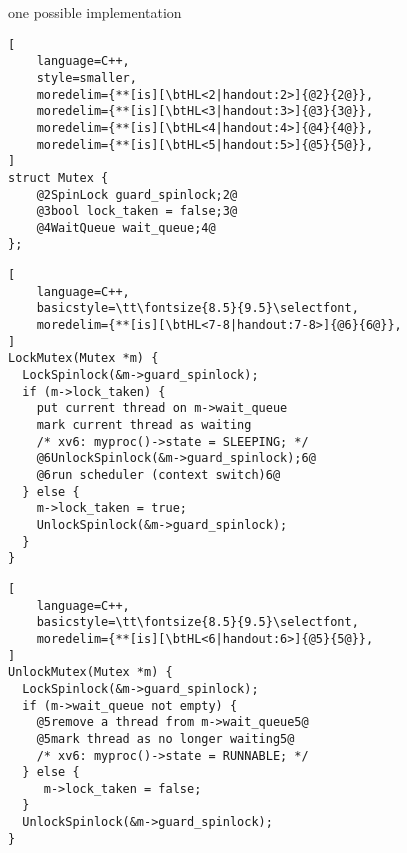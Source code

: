 
\begin{frame}[fragile,label=mutexSketch]{one possible implementation}
\begin{lstlisting}[
    language=C++,
    style=smaller,
    moredelim={**[is][\btHL<2|handout:2>]{@2}{2@}},
    moredelim={**[is][\btHL<3|handout:3>]{@3}{3@}},
    moredelim={**[is][\btHL<4|handout:4>]{@4}{4@}},
    moredelim={**[is][\btHL<5|handout:5>]{@5}{5@}},
]
struct Mutex { 
    @2SpinLock guard_spinlock;2@
    @3bool lock_taken = false;3@
    @4WaitQueue wait_queue;4@
};
\end{lstlisting}
\begin{minipage}{0.45\textwidth}
\begin{lstlisting}[
    language=C++,
    basicstyle=\tt\fontsize{8.5}{9.5}\selectfont,
    moredelim={**[is][\btHL<7-8|handout:7-8>]{@6}{6@}},
]
LockMutex(Mutex *m) {
  LockSpinlock(&m->guard_spinlock);
  if (m->lock_taken) {
    put current thread on m->wait_queue
    mark current thread as waiting
    /* xv6: myproc()->state = SLEEPING; */
    @6UnlockSpinlock(&m->guard_spinlock);6@
    @6run scheduler (context switch)6@
  } else {
    m->lock_taken = true;
    UnlockSpinlock(&m->guard_spinlock);
  }
}
\end{lstlisting}
\end{minipage}
\begin{minipage}{0.45\textwidth}
\begin{lstlisting}[
    language=C++,
    basicstyle=\tt\fontsize{8.5}{9.5}\selectfont,
    moredelim={**[is][\btHL<6|handout:6>]{@5}{5@}},
]
UnlockMutex(Mutex *m) {
  LockSpinlock(&m->guard_spinlock);
  if (m->wait_queue not empty) {
    @5remove a thread from m->wait_queue5@ 
    @5mark thread as no longer waiting5@
    /* xv6: myproc()->state = RUNNABLE; */
  } else {
     m->lock_taken = false;
  }
  UnlockSpinlock(&m->guard_spinlock);
}
\end{lstlisting}
\end{minipage}
\end{frame}
